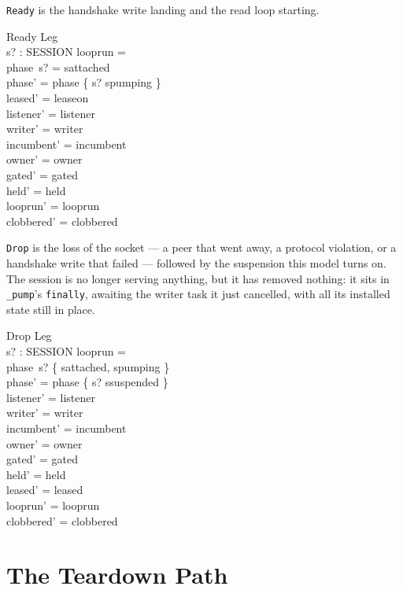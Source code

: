 \documentclass[a4paper,10pt,fleqn]{article}
\begin{document}
\texttt{Ready} is the handshake write landing and the read loop starting.

\begin{schema}{Ready}
  \Delta Leg \\
  s? : SESSION
\where
  looprun = \emptyset \\
  phase~s? = sattached \\
  phase' = phase \oplus \{ s? \mapsto spumping \} \\
  leased' = leaseon \\
  listener' = listener \\
  writer' = writer \\
  incumbent' = incumbent \\
  owner' = owner \\
  gated' = gated \\
  held' = held \\
  looprun' = looprun \\
  clobbered' = clobbered
\end{schema}

\texttt{Drop} is the loss of the socket --- a peer that went away, a
protocol violation, or a handshake write that failed --- followed by the
suspension this model turns on.  The session is no longer serving
anything, but it has removed nothing: it sits in \texttt{\_pump}'s
\texttt{finally}, awaiting the writer task it just cancelled, with all
its installed state still in place.

\begin{schema}{Drop}
  \Delta Leg \\
  s? : SESSION
\where
  looprun = \emptyset \\
  phase~s? \in \{ sattached, spumping \} \\
  phase' = phase \oplus \{ s? \mapsto ssuspended \} \\
  listener' = listener \\
  writer' = writer \\
  incumbent' = incumbent \\
  owner' = owner \\
  gated' = gated \\
  held' = held \\
  leased' = leased \\
  looprun' = looprun \\
  clobbered' = clobbered
\end{schema}

\section{The Teardown Path}
\end{document}
